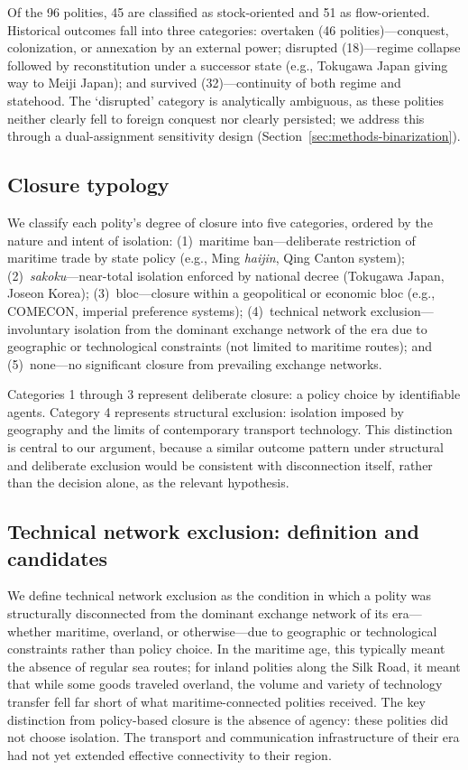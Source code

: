 \documentclass[pdflatex,sn-basic]{sn-jnl}
\theoremstyle{thmstyleone}%
\theoremstyle{thmstyletwo}%
\theoremstyle{thmstylethree}%
\begin{document}
Of the 96 polities, 45 are classified as stock-oriented and 51 as flow-oriented. Historical outcomes fall into three categories: overtaken (46 polities)---conquest, colonization, or annexation by an external power; disrupted (18)---regime collapse followed by reconstitution under a successor state (e.g., Tokugawa Japan giving way to Meiji Japan); and survived (32)---continuity of both regime and statehood. The `disrupted' category is analytically ambiguous, as these polities neither clearly fell to foreign conquest nor clearly persisted; we address this through a dual-assignment sensitivity design (Section~\ref{sec:methods-binarization}).

\subsection{Closure typology}\label{sec:closure-typology}

We classify each polity's degree of closure into five categories, ordered by the nature and intent of isolation: (1)~maritime ban---deliberate restriction of maritime trade by state policy (e.g., Ming \emph{haijin}, Qing Canton system); (2)~\emph{sakoku}---near-total isolation enforced by national decree (Tokugawa Japan, Joseon Korea); (3)~bloc---closure within a geopolitical or economic bloc (e.g., COMECON, imperial preference systems); (4)~technical network exclusion---involuntary isolation from the dominant exchange network of the era due to geographic or technological constraints (not limited to maritime routes); and (5)~none---no significant closure from prevailing exchange networks.

Categories 1 through 3 represent deliberate closure: a policy choice by identifiable agents. Category 4 represents structural exclusion: isolation imposed by geography and the limits of contemporary transport technology. This distinction is central to our argument, because a similar outcome pattern under structural and deliberate exclusion would be consistent with disconnection itself, rather than the decision alone, as the relevant hypothesis.

\subsection{Technical network exclusion: definition and candidates}\label{sec:tech-exclusion}

We define technical network exclusion as the condition in which a polity was structurally disconnected from the dominant exchange network of its era---whether maritime, overland, or otherwise---due to geographic or technological constraints rather than policy choice. In the maritime age, this typically meant the absence of regular sea routes; for inland polities along the Silk Road, it meant that while some goods traveled overland, the volume and variety of technology transfer fell far short of what maritime-connected polities received. The key distinction from policy-based closure is the absence of agency: these polities did not choose isolation. The transport and communication infrastructure of their era had not yet extended effective connectivity to their region.
\end{document}
